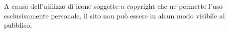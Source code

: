 A causa dell'utilizzo di icone soggette a copyright che ne permette l'uso esclusivamente personale, il sito non può essere in alcun modo visibile al pubblico.
